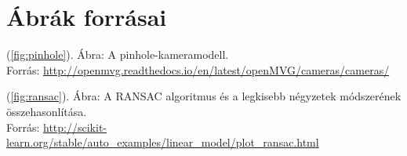 \documentclass[11pt,a4paper,oneside]{report}             %
\author{\vikszerzo}
\title{\viktitle}
\begin{document}
\singlespacing


\onehalfspacing

\tableofcontents\vfill
%



%







%
%
%


%

\chapter*{Ábrák forrásai}
(\ref{fig:pinhole}). Ábra: A pinhole-kameramodell.\\
Forrás: \url{http://openmvg.readthedocs.io/en/latest/openMVG/cameras/cameras/}

(\ref{fig:ransac}). Ábra: A RANSAC algoritmus és a legkisebb négyzetek módszerének összehasonlítása. \\
Forrás: \url{http://scikit-learn.org/stable/auto_examples/linear_model/plot_ransac.html}




%

\label{page:last}
\end{document}
